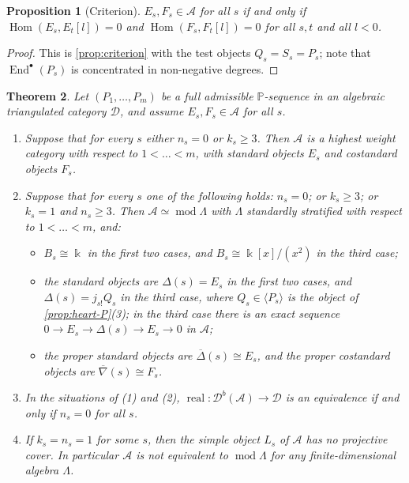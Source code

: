 \documentclass[11pt,reqno]{amsart}
\theoremstyle{plain}
\newtheorem{theorem}{Theorem}[section]
\newtheorem{proposition}[theorem]{Proposition}
\theoremstyle{definition}
\theoremstyle{remark}
\newcommand{\kk}{\Bbbk}
\DeclareMathOperator{\Hom}{Hom}
\DeclareMathOperator{\End}{End}
\DeclareMathOperator{\real}{real}
\newcommand{\modd}{\operatorname{mod}}
\newcommand{\Db}{\mathcal{D}^b}
\newcommand{\thick}[1]{\langle #1\rangle}
\newcommand{\nablabar}{\overline{\nabla}}
\newcommand{\Deltabar}{\overline{\Delta}}
\newcommand{\cD}{\mathcal{D}}
\newcommand{\cA}{\mathcal{A}}
\begin{document}
\begin{proposition}[Criterion]\label{prop:P-criterion}
$E_s,F_s\in\cA$ for all $s$ if and only if $\Hom(E_s,E_t[l])=0$ and $\Hom(F_s,F_t[l])=0$ for all $s,t$ and all $l<0$.
\end{proposition}

\begin{proof}
This is \cref{prop:criterion} with the test objects $Q_s=S_s=P_s$; note that $\End^\bullet(P_s)$ is concentrated in non-negative degrees.
\end{proof}

\begin{theorem}\label{thm:B}
Let $(P_1,\dots,P_m)$ be a full admissible $\mathbb{P}$-sequence in an algebraic triangulated category $\cD$, and assume $E_s,F_s\in\cA$ for all $s$.
\begin{enumerate}
\item Suppose that for every $s$ either $n_s=0$ or $k_s\ge3$. Then $\cA$ is a highest weight category with respect to $1<\dots<m$, with standard objects $E_s$ and costandard objects $F_s$.
\item Suppose that for every $s$ one of the following holds: $n_s=0$; or $k_s\ge3$; or $k_s=1$ and $n_s\ge3$. Then $\cA\simeq\modd\Lambda$ with $\Lambda$ standardly stratified with respect to $1<\dots<m$, and:
\begin{itemize}
\item $B_s\cong\kk$ in the first two cases, and $B_s\cong\kk[x]/(x^2)$ in the third case;
\item the standard objects are $\Delta(s)=E_s$ in the first two cases, and $\Delta(s)=j_{s!}Q_s$ in the third case, where $Q_s\in\thick{P_s}$ is the object of \cref{prop:heart-P}(3); in the third case there is an exact sequence $0\to E_s\to\Delta(s)\to E_s\to0$ in $\cA$;
\item the proper standard objects are $\Deltabar(s)\cong E_s$, and the proper costandard objects are $\nablabar(s)\cong F_s$.
\end{itemize}
\item In the situations of \textup{(1)} and \textup{(2)}, $\real\colon\Db(\cA)\to\cD$ is an equivalence if and only if $n_s=0$ for all $s$.
\item If $k_s=n_s=1$ for some $s$, then the simple object $L_s$ of $\cA$ has no projective cover. In particular $\cA$ is not equivalent to $\modd\Lambda$ for any finite-dimensional algebra $\Lambda$.
\end{enumerate}
\end{theorem}
\end{document}
